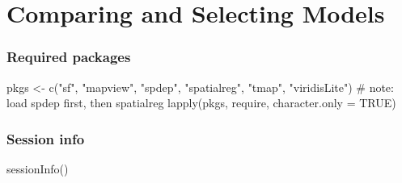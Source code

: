 \documentclass[
  letterpaper,
]{scrbook}
\newenvironment{Shaded}{\begin{snugshade}}{\end{snugshade}}
\newcommand{\AttributeTok}[1]{\textcolor[rgb]{0.40,0.45,0.13}{#1}}
\newcommand{\CommentTok}[1]{\textcolor[rgb]{0.37,0.37,0.37}{#1}}
\newcommand{\ConstantTok}[1]{\textcolor[rgb]{0.56,0.35,0.01}{#1}}
\newcommand{\FunctionTok}[1]{\textcolor[rgb]{0.28,0.35,0.67}{#1}}
\newcommand{\NormalTok}[1]{\textcolor[rgb]{0.00,0.23,0.31}{#1}}
\newcommand{\OtherTok}[1]{\textcolor[rgb]{0.00,0.23,0.31}{#1}}
\newcommand{\StringTok}[1]{\textcolor[rgb]{0.13,0.47,0.30}{#1}}
\begin{document}

\hypertarget{comparing-and-selecting-models}{%
\chapter{Comparing and Selecting
Models}\label{comparing-and-selecting-models}}

\hypertarget{required-packages-9}{%
\subsection*{Required packages}\label{required-packages-9}}

\begin{Shaded}
\begin{Highlighting}[]
\NormalTok{pkgs }\OtherTok{\textless{}{-}} \FunctionTok{c}\NormalTok{(}\StringTok{"sf"}\NormalTok{, }\StringTok{"mapview"}\NormalTok{, }\StringTok{"spdep"}\NormalTok{, }\StringTok{"spatialreg"}\NormalTok{, }\StringTok{"tmap"}\NormalTok{, }\StringTok{"viridisLite"}\NormalTok{) }\CommentTok{\# note: load spdep first, then spatialreg}
\FunctionTok{lapply}\NormalTok{(pkgs, require, }\AttributeTok{character.only =} \ConstantTok{TRUE}\NormalTok{)}
\end{Highlighting}
\end{Shaded}

\hypertarget{session-info-9}{%
\subsection*{Session info}\label{session-info-9}}

\begin{Shaded}
\begin{Highlighting}[]
\FunctionTok{sessionInfo}\NormalTok{()}
\end{Highlighting}
\end{Shaded}
\end{document}
